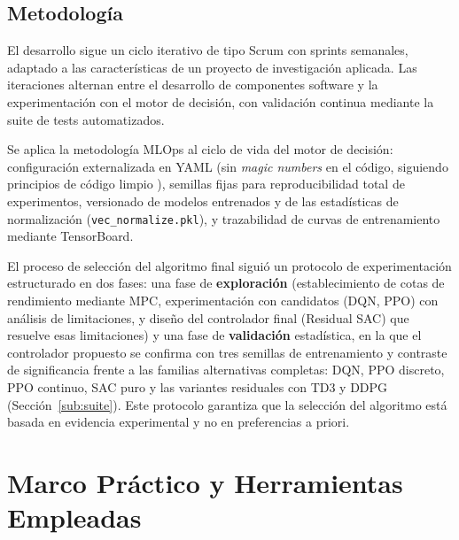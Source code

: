 \documentclass[12pt, a4paper, twoside]{report}
\begin{document}
\section{Metodología}

El desarrollo sigue un ciclo iterativo de tipo Scrum con sprints semanales,
adaptado a las características de un proyecto de investigación aplicada. Las
iteraciones alternan entre el desarrollo de componentes software y la
experimentación con el motor de decisión, con validación continua mediante la
suite de tests automatizados.

Se aplica la metodología MLOps al ciclo de vida del motor de decisión:
configuración externalizada en YAML (sin \textit{magic numbers} en el código,
siguiendo principios de código limpio \citep{Martin2009}),
semillas fijas para reproducibilidad total de experimentos, versionado de modelos
entrenados y de las estadísticas de normalización (\texttt{vec\_normalize.pkl}),
y trazabilidad de curvas de entrenamiento mediante TensorBoard.

El proceso de selección del algoritmo final siguió un protocolo de
experimentación estructurado en dos fases: una fase de \textbf{exploración}
(establecimiento de cotas de rendimiento mediante MPC, experimentación con
candidatos (DQN, PPO) con análisis de limitaciones, y diseño del controlador
final (Residual SAC) que resuelve esas limitaciones) y una fase de
\textbf{validación} estadística, en la que el controlador propuesto se
confirma con tres semillas de entrenamiento y contraste de significancia
frente a las familias alternativas completas: DQN, PPO discreto, PPO continuo,
SAC puro y las variantes residuales con TD3 y DDPG
(Sección~\ref{sub:suite}). Este protocolo garantiza que la selección del
algoritmo está basada en evidencia experimental y no en preferencias a priori.

\chapter{Marco Práctico y Herramientas Empleadas}
\label{chap:marco}
\end{document}
